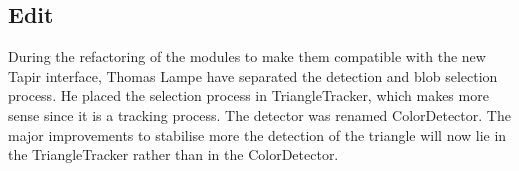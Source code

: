 \subsection{Edit}
\label{sec:ocd:edit}

During the refactoring of the modules to make them compatible with the 
new Tapir interface, Thomas Lampe have separated the detection and blob 
selection process. He placed the selection process in TriangleTracker, 
which makes more sense since it is a tracking process. The detector was 
renamed ColorDetector. The major improvements to stabilise more the 
detection of the triangle will now lie in the TriangleTracker rather 
than in the ColorDetector.
